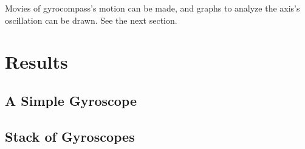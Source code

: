 \documentclass[12pt]{article}
\renewcommand{\(}{\left (}
\renewcommand{\)}{\right )}
\begin{document}
Movies of gyrocompass's motion can be made, and graphs to analyze the axis's oscillation can be drawn. See the next section.






%



\section{Results}

\subsection{A Simple Gyroscope}
\subsection{Stack of Gyroscopes}
\end{document}
